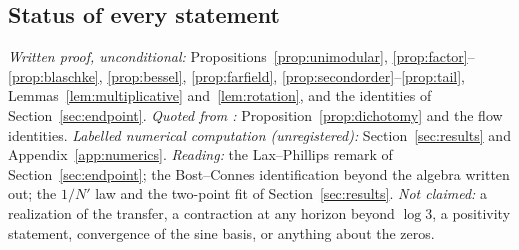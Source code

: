\subsection{Status of every statement}

\emph{Written proof, unconditional:} Propositions~\ref{prop:unimodular},
\ref{prop:factor}--\ref{prop:blaschke}, \ref{prop:bessel}, \ref{prop:farfield},
\ref{prop:secondorder}--\ref{prop:tail}, Lemmas~\ref{lem:multiplicative}
and~\ref{lem:rotation}, and the identities of Section~\ref{sec:endpoint}.
\emph{Quoted from \cite{WilsonLines}:} Proposition~\ref{prop:dichotomy} and the
flow identities. \emph{Labelled numerical computation (unregistered):}
Section~\ref{sec:results} and Appendix~\ref{app:numerics}. \emph{Reading:} the
Lax--Phillips remark of Section~\ref{sec:endpoint}; the Bost--Connes
identification beyond the algebra written out; the $1/N'$ law and the two-point
fit of Section~\ref{sec:results}. \emph{Not claimed:} a realization of the
transfer, a contraction at any horizon beyond $\log3$, a positivity statement,
convergence of the sine basis, or anything about the zeros.
